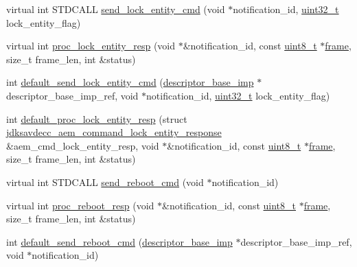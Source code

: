 \begin{DoxyCompactItemize}
\item 
virtual int S\+T\+D\+C\+A\+LL \hyperlink{classavdecc__lib_1_1descriptor__base__imp_a26fd66d8c409502eaa4dba47742ca7fa}{send\+\_\+lock\+\_\+entity\+\_\+cmd} (void $\ast$notification\+\_\+id, \hyperlink{parse_8c_a6eb1e68cc391dd753bc8ce896dbb8315}{uint32\+\_\+t} lock\+\_\+entity\+\_\+flag)
\item 
virtual int \hyperlink{classavdecc__lib_1_1descriptor__base__imp_a6cd2b73ea95b18f07dbdc251140679b0}{proc\+\_\+lock\+\_\+entity\+\_\+resp} (void $\ast$\&notification\+\_\+id, const \hyperlink{stdint_8h_aba7bc1797add20fe3efdf37ced1182c5}{uint8\+\_\+t} $\ast$\hyperlink{gst__avb__playbin_8c_ac8e710e0b5e994c0545d75d69868c6f0}{frame}, size\+\_\+t frame\+\_\+len, int \&status)
\item 
int \hyperlink{classavdecc__lib_1_1descriptor__base__imp_af40ac09b84feb7551bf0389a2a5db4ca}{default\+\_\+send\+\_\+lock\+\_\+entity\+\_\+cmd} (\hyperlink{classavdecc__lib_1_1descriptor__base__imp}{descriptor\+\_\+base\+\_\+imp} $\ast$descriptor\+\_\+base\+\_\+imp\+\_\+ref, void $\ast$notification\+\_\+id, \hyperlink{parse_8c_a6eb1e68cc391dd753bc8ce896dbb8315}{uint32\+\_\+t} lock\+\_\+entity\+\_\+flag)
\item 
int \hyperlink{classavdecc__lib_1_1descriptor__base__imp_a3b3582020613e7f60efe96567679be7f}{default\+\_\+proc\+\_\+lock\+\_\+entity\+\_\+resp} (struct \hyperlink{structjdksavdecc__aem__command__lock__entity__response}{jdksavdecc\+\_\+aem\+\_\+command\+\_\+lock\+\_\+entity\+\_\+response} \&aem\+\_\+cmd\+\_\+lock\+\_\+entity\+\_\+resp, void $\ast$\&notification\+\_\+id, const \hyperlink{stdint_8h_aba7bc1797add20fe3efdf37ced1182c5}{uint8\+\_\+t} $\ast$\hyperlink{gst__avb__playbin_8c_ac8e710e0b5e994c0545d75d69868c6f0}{frame}, size\+\_\+t frame\+\_\+len, int \&status)
\item 
virtual int S\+T\+D\+C\+A\+LL \hyperlink{classavdecc__lib_1_1descriptor__base__imp_a7579db44e8e86da0f8f94aa4680df795}{send\+\_\+reboot\+\_\+cmd} (void $\ast$notification\+\_\+id)
\item 
virtual int \hyperlink{classavdecc__lib_1_1descriptor__base__imp_a8b3de398748e8299daf7296964f73c22}{proc\+\_\+reboot\+\_\+resp} (void $\ast$\&notification\+\_\+id, const \hyperlink{stdint_8h_aba7bc1797add20fe3efdf37ced1182c5}{uint8\+\_\+t} $\ast$\hyperlink{gst__avb__playbin_8c_ac8e710e0b5e994c0545d75d69868c6f0}{frame}, size\+\_\+t frame\+\_\+len, int \&status)
\item 
int \hyperlink{classavdecc__lib_1_1descriptor__base__imp_a14e3bd11c70e839a0594dc59dffcbf16}{default\+\_\+send\+\_\+reboot\+\_\+cmd} (\hyperlink{classavdecc__lib_1_1descriptor__base__imp}{descriptor\+\_\+base\+\_\+imp} $\ast$descriptor\+\_\+base\+\_\+imp\+\_\+ref, void $\ast$notification\+\_\+id)

\end{DoxyCompactItemize}
